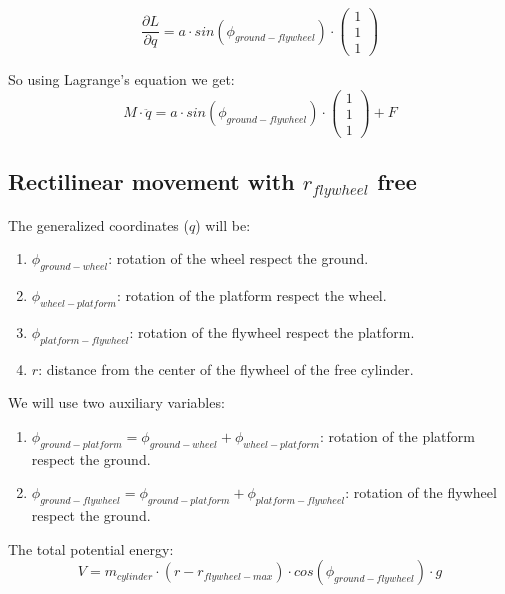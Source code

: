 \begin{equation}
	\frac{\partial L}{\partial q} = a \cdot sin(\phi_{ground-flywheel}) \cdot 	
	\begin{pmatrix}
	1 \\ 1 \\ 1
	\end{pmatrix}	
\end{equation}

So using Lagrange's equation we get:
\begin{equation}
	\boxed{
	M \cdot \ddot{q} = a \cdot sin(\phi_{ground-flywheel}) \cdot 	
	\begin{pmatrix}
	1 \\ 1 \\ 1
	\end{pmatrix} + F
	}
\end{equation}

\subsection{Rectilinear movement with $r_{flywheel}$ free}

The generalized coordinates ($q$) will be:
\begin{enumerate}
	\item $\phi_{ground-wheel}$: rotation of the wheel respect the ground.
	\item $\phi_{wheel-platform}$: rotation of the platform respect the wheel.
	\item $\phi_{platform-flywheel}$: rotation of the flywheel respect the platform.
	\item $r$: distance from the center of the flywheel of the free cylinder.

\end{enumerate}

We will use two auxiliary variables:
\begin{enumerate}
	\item $\phi_{ground-platform}=\phi_{ground-wheel}+\phi_{wheel-platform}$: rotation of the platform respect the ground.
	\item $\phi_{ground-flywheel}=\phi_{ground-platform}+\phi_{platform-flywheel}$: rotation of the flywheel respect the ground.
\end{enumerate}

The total potential energy:
\begin{equation}
	V = m_{cylinder}\cdot (r-r_{flywheel-max}) \cdot cos(\phi_{ground-flywheel}) \cdot g	
\end{equation}



